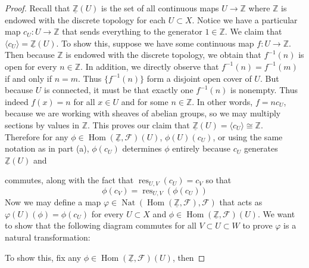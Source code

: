 \documentclass{article}
\newcommand{\Z}{\mathbb{Z}}
\newcommand{\fF}{\mathscr{F}}
\DeclareMathOperator{\res}{\mathrm{res}}
\DeclareMathOperator{\Hom}{\mathrm{Hom}}
\DeclareMathOperator{\Nat}{\mathrm{Nat}}
\begin{document}
\begin{proof}
    Recall that $\underline{\Z}(U)$ is the set of all continuous maps $U\to \Z$ where $\Z$ is endowed with the discrete topology for each $U\subset X$. Notice we have a particular map $c_U:U\to \Z$ that sends everything to the generator $1\in \Z$. We claim that $\langle c_U \rangle = \underline{\Z}(U)$. To show this, suppose we have some continuous map $f:U\to \Z$. Then because $\Z$ is endowed with the discrete topology, we obtain that $f^{-1}(n)$ is open for every $n\in \Z$. In addition, we directly observe that $f^{-1}(n)=f^{-1}(m)$ if and only if $n=m$. Thus $\{f^{-1}(n)\}$ form a disjoint open cover of $U$. But because $U$ is connected, it must be that exactly one $f^{-1}(n)$ is nonempty. Thus indeed $f(x)=n$ for all $x\in U$ and for some $n\in \Z$. In other words, $f=nc_U$, because we are working with sheaves of abelian groups, so we may multiply sections by values in $\Z$. This proves our claim that $\underline{\Z}(U)=\langle c_U\rangle \cong \Z$.\\
    Therefore for any $\phi \in \Hom(\underline{\Z}, \fF)(U)$, $\phi(U)(c_U)$, or using the same notation as in part (a), $\phi(c_U)$ determines $\phi$ entirely because $c_U$ generates $\underline{\Z}(U)$ and
    \begin{center}
    \end{center}
    commutes, along with the fact that $\res_{U,V}(c_U)=c_V$ so that
    \[
    \phi(c_V)=\res_{U,V}(\phi(c_U))
    \]
    Now we may define a map $\varphi \in \Nat(\Hom(\underline{\Z},\fF),\fF)$ that acts as $\varphi(U)(\phi)=\phi(c_U)$ for every $U\subset X$ and $\phi\in \Hom(\underline{\Z},\fF)(U)$. We want to show that the following diagram commutes for all $V\subset U\subset W$ to prove $\varphi$ is a natural transformation:
    \begin{center}
    \end{center}
    To show this, fix any $\phi\in \Hom(\underline{\Z},\fF)(U)$, then 

\end{proof}
\end{document}
